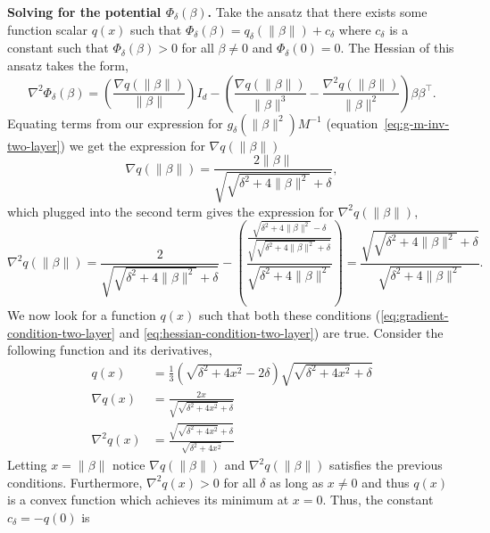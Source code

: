 \documentclass{article}
\theoremstyle{plain}
\theoremstyle{definition}
\theoremstyle{remark}
\begin{document}
\textbf{Solving for the potential $\Phi_\delta(\beta)$.}
%
Take the ansatz that there exists some function scalar $q(x)$ such that $\Phi_\delta(\beta) = q_\delta(\|\beta\|) + c_\delta$ where $c_\delta$ is a constant such that $\Phi_\delta(\beta) > 0$ for all $\beta \neq 0$ and $\Phi_\delta(0) = 0$.
%
The Hessian of this ansatz takes the form,
\begin{equation}
    \nabla^2 \Phi_\delta(\beta) = \left(\frac{\nabla q(\|\beta\|)}{\|\beta\|}\right) I_d - \left(\frac{\nabla q(\|\beta\|)}{\|\beta\|^{3}} - \frac{\nabla^2 q(\|\beta\|)}{\|\beta\|^2}\right)\beta\beta^\intercal.
\end{equation}
Equating terms from our expression for $g_\delta\left(\|\beta\|^2\right)M^{-1}$ (equation~\ref{eq:g-m-inv-two-layer}) we get the expression for $\nabla q(\|\beta\|)$
\begin{equation}
    \label{eq:gradient-condition-two-layer}
    \nabla q(\|\beta\|) = \frac{2\|\beta\|}{\sqrt{\sqrt{\delta^2 + 4\|\beta\|^2} + \delta}},
\end{equation}
which plugged into the second term gives the expression for $\nabla^2 q(\|\beta\|)$,
\begin{equation}
    \label{eq:hessian-condition-two-layer}
    \nabla^2 q(\|\beta\|) = \frac{2}{\sqrt{\sqrt{\delta^2 + 4\|\beta\|^2} + \delta}} - \left(\frac{\frac{\sqrt{\delta^2 + 4\|\beta\|^2} - \delta}{\sqrt{\sqrt{\delta^2 + 4\|\beta\|^2} + \delta}}}{\sqrt{\delta^2 + 4\|\beta\|^2}}\right) = \frac{\sqrt{\sqrt{\delta^2 + 4\|\beta\|^2} + \delta}}{\sqrt{\delta^2 + 4\|\beta\|^2}}.
\end{equation}
%
We now look for a function $q(x)$ such that both these conditions (\cref{eq:gradient-condition-two-layer} and \cref{eq:hessian-condition-two-layer}) are true.
%
Consider the following function and its derivatives,
\begin{align}
    q(x) &= \frac{1}{3}\left(\sqrt{\delta^2 + 4x^2} - 2\delta\right)\sqrt{\sqrt{\delta^2 + 4x^2} + \delta}\\
    \nabla q(x) &= \frac{2x}{\sqrt{\sqrt{\delta^2 + 4x^2} + \delta}}\\
    \nabla^2 q(x) &= \frac{\sqrt{\sqrt{\delta^2 + 4x^2} + \delta}}{\sqrt{\delta^2 + 4x^2}}
\end{align}
Letting $x = \|\beta\|$ notice $\nabla q(\|\beta\|)$ and $\nabla^2 q(\|\beta\|)$ satisfies the previous conditions.
%
Furthermore, $\nabla^2 q(x) > 0$ for all $\delta$ as long as $x \neq 0$ and thus $q(x)$ is a convex function which achieves its minimum at $x = 0$. 
%
Thus, the constant $c_\delta = -q(0)$ is
\end{document}
